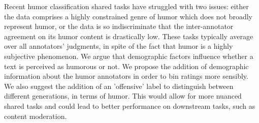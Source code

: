 Recent humor classification shared tasks have struggled with two issues: either the data comprises a highly constrained genre of humor which does not broadly represent humor, or the data is so indiscriminate that the inter-annotator agreement on its humor content is drastically low. These tasks typically average over all annotators' judgments, in spite of the fact that humor is a highly subjective phenomenon. We argue that demographic factors influence whether a text is perceived as humorous or not. We propose the addition of demographic information about the humor annotators in order to bin ratings more sensibly. We also suggest the addition of an 'offensive' label to distinguish between different generations, in terms of humor. This would allow for more nuanced shared tasks and could lead to better performance on downstream tasks, such as content moderation.
